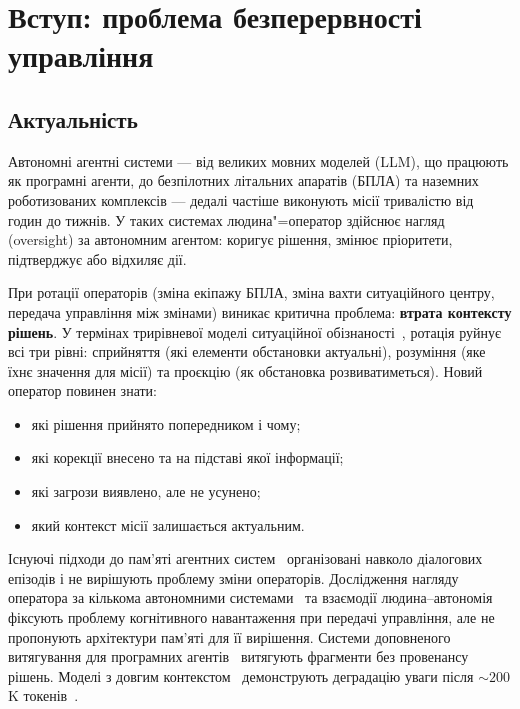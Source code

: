 \documentclass[11pt]{article}
\begin{document}
\section{Вступ: проблема безперервності управління}
\label{sec:intro}

\subsection{Актуальність}

Автономні агентні системи --- від великих мовних моделей (LLM), що працюють як програмні агенти, до безпілотних літальних апаратів (БПЛА) та наземних роботизованих комплексів --- дедалі частіше виконують місії тривалістю від годин до тижнів.
У таких системах людина"=оператор здійснює нагляд (oversight) за автономним агентом: коригує рішення, змінює пріоритети, підтверджує або відхиляє дії.

При ротації операторів (зміна екіпажу БПЛА, зміна вахти ситуаційного центру, передача управління між змінами) виникає критична проблема: \textbf{втрата контексту рішень}.
У термінах трирівневої моделі ситуаційної обізнаності~\citep{endsley1995sa}, ротація руйнує всі три рівні: сприйняття (які елементи обстановки актуальні), розуміння (яке їхнє значення для місії) та проєкцію (як обстановка розвиватиметься).
Новий оператор повинен знати:
\begin{itemize}[nosep]
  \item які рішення прийнято попередником і чому;
  \item які корекції внесено та на підставі якої інформації;
  \item які загрози виявлено, але не усунено;
  \item який контекст місії залишається актуальним.
\end{itemize}

Існуючі підходи до пам'яті агентних систем~\citep{packer2023memgpt, park2023generative, chhikara2025mem0} організовані навколо діалогових епізодів і не вирішують проблему зміни операторів.
Дослідження нагляду оператора за кількома автономними системами~\citep{chen2011supervisory} та взаємодії людина--автономія~\citep{oneill2022hat} фіксують проблему когнітивного навантаження при передачі управління, але не пропонують архітектури пам'яті для її вирішення.
Системи доповненого витягування для програмних агентів~\citep{zhang2023repocoder} витягують фрагменти без провенансу рішень.
Моделі з довгим контекстом~\citep{reid2024gemini} демонструють деградацію уваги після ${\sim}200$K токенів~\citep{liu2023lost}.
\end{document}
